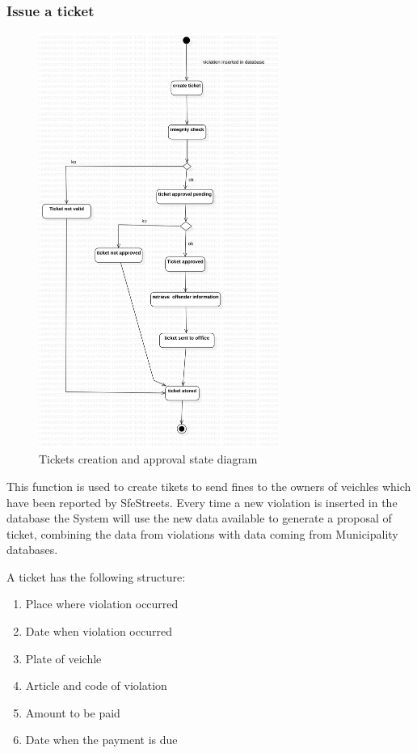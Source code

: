 \subsubsection{Issue a ticket}
\begin{figure}
\centering
\includegraphics[width=0.7\textwidth]{Images/ticketstate.png}
\caption{\label{fig:ticketstatediag} Tickets creation and approval state diagram}
\end{figure}

This function is used to create tikets to send fines to the owners of veichles which have been reported by SfeStreets.
Every time a new violation is inserted in the database the System will use the new data available to generate a proposal of ticket, combining the data from violations with data coming from Municipality databases.

A ticket has the following structure:
\begin{enumerate}
  \item Place where violation occurred
  \item Date when violation occurred
  \item Plate of veichle
  \item Article and code of violation
  \item Amount to be paid
  \item Date when the payment is due
\end{enumerate}

